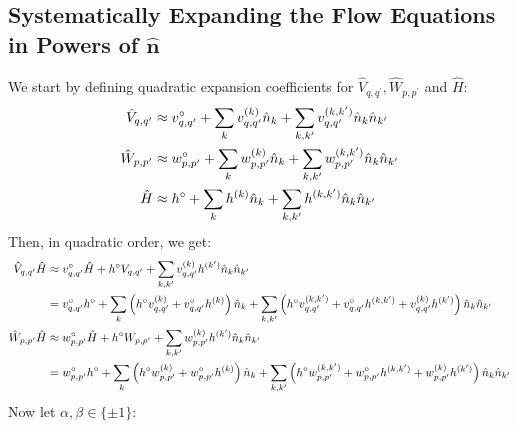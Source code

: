 \begin{appendix}
\subsection{Systematically Expanding the Flow Equations in Powers of $\mathbf{\hat n}$}
We start by defining quadratic expansion coefficients for $\hat V_{q,q^\prime},  \hat W_{p,p^\prime}$ and $\hat H$:
\begin{subequations}
\begin{align}
\hat V_{q,q^\prime}&\approx  v_{q,q^\prime}^{\circ} + \sum\limits_k v_{q,q^\prime}^{(k)}\hat n_k + \sum\limits_{k,k^\prime} v_{q,q^\prime}^{(k,k^\prime)}\hat n_k\hat n_ {k^\prime}\\
\hat W_{p,p^\prime}&\approx  w_{p,p^\prime}^{\circ} + \sum\limits_k w_{p,p^\prime}^{(k)}\hat n_k + \sum\limits_{k,k^\prime} w_{p,p^\prime}^{(k,k^\prime)}\hat n_k\hat n_ {k^\prime}\\
\hat H&\approx  h^{\circ} + \sum\limits_k h^{(k)}\hat n_k + \sum\limits_{k,k^\prime} h^{(k,k^\prime)}\hat n_k\hat n_ {k^\prime}
\end{align}
\end{subequations}
Then, in quadratic order, we get:
\begin{subequations}
\begin{align}
\hat V_{q,q^\prime} \hat H &\approx v_{q,q^\prime}^{\circ}\hat H+h^{\circ}V_{q,q^\prime}+\sum\limits_{k,k^\prime} v_{q,q^\prime}^{(k)}h^{(k^\prime)}\hat n_k\hat n_{k^\prime}\nonumber\\ 
 & = v_{q,q^\prime}^{\circ}h^{\circ}+\sum\limits_k \left(h^\circ v_{q,q^\prime}^{(k)} + v_{q,q^\prime}^{\circ}h^{(k)}\right)\hat n_k + \sum\limits_{k,k^\prime} \left( h^\circ v_{q,q^\prime}^{(k,k^\prime)}+v_{q,q^\prime}^{\circ} h^{(k,k^\prime)}+v_{q,q^\prime}^{(k)}h^{(k^\prime)}\right)\hat n_k\hat n_{k^\prime}\\
\hat W_{p,p^\prime} \hat H &\approx w_{p,p^\prime}^{\circ}\hat H+h^{\circ}W_{p,p^\prime}+\sum\limits_{k,k^\prime} w_{p,p^\prime}^{(k)}h^{(k^\prime)}\hat n_k\hat n_{k^\prime}\nonumber\\ 
 & = w_{p,p^\prime}^{\circ}h^{\circ}+\sum\limits_k \left(h^\circ w_{p,p^\prime}^{(k)} + w_{p,p^\prime}^{\circ}h^{(k)}\right)\hat n_k + \sum\limits_{k,k^\prime} \left( h^\circ w_{p,p^\prime}^{(k,k^\prime)}+w_{p,p^\prime}^{\circ} h^{(k,k^\prime)}+w_{p,p^\prime}^{(k)}h^{(k^\prime)}\right)\hat n_k\hat n_{k^\prime}
\end{align}
\end{subequations}
Now let $\alpha,\beta\in\{\pm 1\}$:


\end{appendix}
